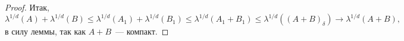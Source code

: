 \begin{theorem}
\begin{proof}
        Итак, 
        \[
            \lambda^{1/d}(A)+\lambda^{1/d}(B)\leqslant
            \lambda^{1/d}(A_1)+\lambda^{1/d}(B_1)\leqslant
            \lambda^{1/d}(A_1+B_1)\leqslant
            \lambda^{1/d}((A+B)_{\delta})\to \lambda^{1/d}(A+B),
        \]
        в силу леммы, так как $A+B$~--- компакт. 

    \end{proof}
\end{theorem}

